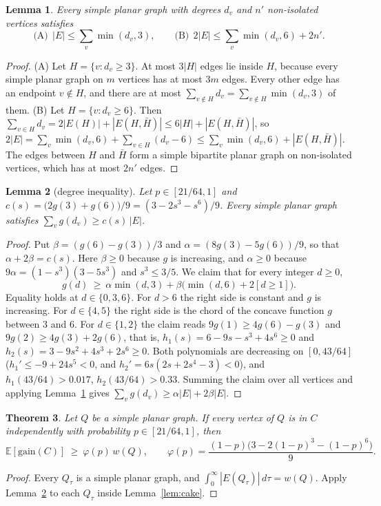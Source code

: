 \documentclass[11pt]{article}
\newtheorem{theorem}{Theorem}
\newtheorem{lemma}[theorem]{Lemma}
\theoremstyle{remark}
\newcommand{\E}{\mathbb{E}}
\begin{document}
\begin{lemma}\label{lem:facts}
Every simple planar graph with degrees $d_v$ and $n'$ non-isolated vertices satisfies
\[
  \text{(A)}\ \ |E|\le\sum_v\min(d_v,3),\qquad
  \text{(B)}\ \ 2|E|\le\sum_v\min(d_v,6)+2n'.
\]
\end{lemma}
\begin{proof}
(A) Let $H=\{v:d_v\ge3\}$. At most $3|H|$ edges lie inside $H$, because every simple planar graph on
$m$ vertices has at most $3m$ edges. Every other edge has an endpoint $v\notin H$, and there are at
most $\sum_{v\notin H}d_v=\sum_{v\notin H}\min(d_v,3)$ of them.
(B) Let $H=\{v:d_v\ge6\}$. Then $\sum_{v\in H}d_v=2|E(H)|+|E(H,\bar H)|\le 6|H|+|E(H,\bar H)|$, so
$2|E|=\sum_v\min(d_v,6)+\sum_{v\in H}(d_v-6)\le\sum_v\min(d_v,6)+|E(H,\bar H)|$. The edges between $H$
and $\bar H$ form a simple bipartite planar graph on non-isolated vertices, which has at most
$2n'$ edges.
\end{proof}

\begin{lemma}[degree inequality]\label{lem:degree}
Let $p\in[21/64,1]$ and $c(s)=\big(2g(3)+g(6)\big)/9=(3-2s^3-s^6)/9$. Every simple planar graph
satisfies $\sum_v g(d_v)\ge c(s)\,|E|$.
\end{lemma}
\begin{proof}
Put $\beta=(g(6)-g(3))/3$ and $\alpha=(8g(3)-5g(6))/9$, so that $\alpha+2\beta=c(s)$. Here
$\beta\ge0$ because $g$ is increasing, and $\alpha\ge0$ because $9\alpha=(1-s^3)(3-5s^3)$ and
$s^3\le 3/5$. We claim that for every
integer $d\ge0$,
\[
  g(d)\ \ge\ \alpha\min(d,3)+\beta\big(\min(d,6)+2[d\ge1]\big).
\]
Equality holds at $d\in\{0,3,6\}$. For $d>6$ the right side is constant and $g$ is increasing. For
$d\in\{4,5\}$ the right side is the chord of the concave function $g$ between $3$ and $6$. For
$d\in\{1,2\}$ the claim reads $9g(1)\ge4g(6)-g(3)$ and $9g(2)\ge4g(3)+2g(6)$, that is,
$h_1(s)=6-9s-s^3+4s^6\ge0$ and $h_2(s)=3-9s^2+4s^3+2s^6\ge0$. Both polynomials are decreasing on
$[0,43/64]$ ($h_1'\le-9+24s^5<0$, and $h_2'=6s(2s+2s^4-3)<0$), and $h_1(43/64)>0.017$,
$h_2(43/64)>0.33$. Summing the claim over all vertices and applying Lemma~\ref{lem:facts} gives
$\sum_vg(d_v)\ge\alpha|E|+2\beta|E|$.
\end{proof}

\begin{theorem}\label{thm:planar}
Let $Q$ be a simple planar graph. If every vertex of $Q$ is in $C$ independently with probability
$p\in[21/64,1]$, then
\[
  \E[\mathrm{gain}(C)]\ \ge\ \varphi(p)\,w(Q),\qquad \varphi(p)=\frac{(1-p)\big(3-2(1-p)^3-(1-p)^6\big)}{9}.
\]
\end{theorem}
\begin{proof}
Every $Q_\tau$ is a simple planar graph, and $\int_0^\infty|E(Q_\tau)|\,d\tau=w(Q)$. Apply
Lemma~\ref{lem:degree} to each $Q_\tau$ inside Lemma~\ref{lem:cake}.
\end{proof}
\end{document}
